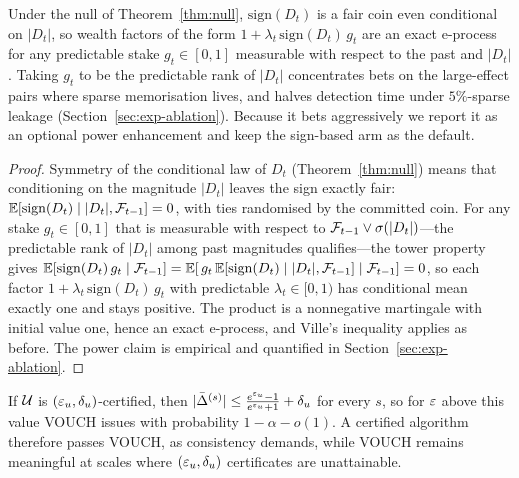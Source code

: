\begin{proposition}\label{prop:magnitude}
Under the null of Theorem~\ref{thm:null}, $\mathrm{sign}(D_t)$ is a fair coin even
conditional on $|D_t|$, so wealth factors of the form
$1 + \lambda_t\,\mathrm{sign}(D_t)\,g_t$ are an exact e-process for any predictable
stake $g_t \in [0,1]$ measurable with respect to the past and $|D_t|$. Taking $g_t$ to
be the predictable rank of $|D_t|$ concentrates bets on the large-effect pairs where
sparse memorisation lives, and halves detection time under $5\%$-sparse leakage
(Section~\ref{sec:exp-ablation}). Because it bets aggressively we report it as an
optional power enhancement and keep the sign-based arm as the default.
\end{proposition}

\begin{proof}
Symmetry of the conditional law of $D_t$ (Theorem~\ref{thm:null}) means that
conditioning on the magnitude $|D_t|$ leaves the sign exactly fair:
$\mathbb{E}[\mathrm{sign}(D_t) \mid |D_t|, \mathcal{F}_{t-1}] = 0$, with ties randomised by the
committed coin. For any stake $g_t \in [0,1]$ that is measurable with respect to
$\mathcal{F}_{t-1} \vee \sigma(|D_t|)$---the predictable rank of $|D_t|$ among past magnitudes
qualifies---the tower property gives
$\mathbb{E}[\mathrm{sign}(D_t)\, g_t \mid \mathcal{F}_{t-1}] = \mathbb{E}[\,g_t\,
\mathbb{E}[\mathrm{sign}(D_t) \mid |D_t|, \mathcal{F}_{t-1}] \mid \mathcal{F}_{t-1}] = 0$, so each factor
$1 + \lambda_t\, \mathrm{sign}(D_t)\, g_t$ with predictable $\lambda_t \in [0,1)$ has
conditional mean exactly one and stays positive. The product is a nonnegative
martingale with initial value one, hence an exact e-process, and Ville's inequality
applies as before. The power claim is empirical and quantified in
Section~\ref{sec:exp-ablation}.
\end{proof}

\begin{proposition}\label{prop:bridge}
If $\mathcal{U}$ is $(\varepsilon_u,\delta_u)$-certified, then
$|\bar\Delta^{(s)}| \le \tfrac{e^{\varepsilon_u}-1}{e^{\varepsilon_u}+1} + \delta_u$ for every $s$, so for
$\varepsilon$ above this value VOUCH issues with probability $1 - \alpha - o(1)$. A certified
algorithm therefore passes VOUCH, as consistency demands, while VOUCH remains meaningful
at scales where $(\varepsilon_u,\delta_u)$ certificates are unattainable.
\end{proposition}

